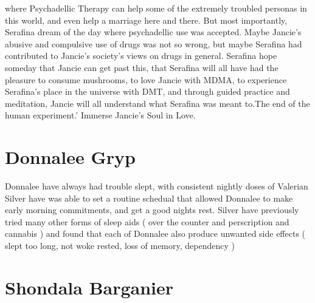 \documentclass[12pt]{book}
\begin{document}
where Psychadellic Therapy can help some of the extremely troubled personas in this world, and even help a marriage here and there. But most importantly, Serafina dream of the day where psychadellic use was accepted. Maybe Jancie's abusive and compulsive use of drugs was not so wrong, but maybe Serafina had contributed to Jancie's society's views on drugs in general. Serafina hope someday that Jancie can get past this, that Serafina will all have had the pleasure to consume mushrooms, to love Jancie with MDMA, to experience Serafina's place in the universe with DMT, and through guided practice and meditation, Jancie will all understand what Serafina was meant to.The end of the human experiment.' Immerse Jancie's Soul in Love.



\chapter{Donnalee Gryp}

Donnalee have always had trouble slept, with consistent nightly doses of Valerian Silver have was able to set a routine schedual that allowed Donnalee to make early morning commitments, and get a good nights rest. Silver have previously tried many other forms of sleep aids ( over the counter and perscription and cannabis ) and found that each of Donnalee also produce unwanted side effects ( slept too long, not woke rested, loss of memory, dependency )






\chapter{Shondala Barganier}
\end{document}
